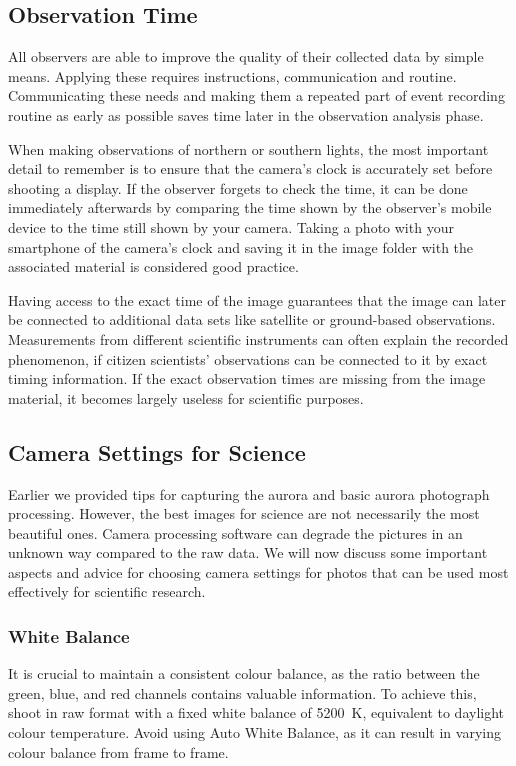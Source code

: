 \documentclass{article}
\begin{document}
\subsection{Observation Time}\label{data_cit_time}

All observers are able to improve the quality of their collected data by simple means. Applying these requires instructions, communication and routine. Communicating these needs and making them a repeated part of event recording routine as early as possible saves time later in the observation analysis phase.

When making observations of northern or southern lights, the most important detail to remember is to ensure that the camera's clock is accurately set before shooting a display. If the observer forgets to check the time, it can be done immediately afterwards by comparing the time shown by the observer's mobile device to the time still shown by your camera. Taking a photo with your smartphone of the camera's clock and saving it in the image folder with the associated material is considered good practice. 

Having access to the exact time of the image guarantees that the image can later be connected to additional data sets like satellite or ground-based observations. Measurements from different scientific instruments can often explain the recorded phenomenon, if citizen scientists' observations can be connected to it by exact timing information. If the exact observation times are missing from the image material, it becomes largely useless for scientific purposes. 

\subsection{Camera Settings for Science}
Earlier we provided tips for capturing the aurora and basic aurora photograph processing. However, the best images for science are not necessarily the most beautiful ones. Camera processing software can degrade the pictures in an unknown way compared to the raw data. We will now discuss some important aspects and advice for choosing camera settings for photos that can be used most effectively for scientific research.

\subsubsection{White Balance}
It is crucial to maintain a consistent colour balance, as the ratio between the green, blue, and red channels contains valuable information. To achieve this, shoot in raw format with a fixed white balance of 5200~K, equivalent to daylight colour temperature. Avoid using Auto White Balance, as it can result in varying colour balance from frame to frame.
\end{document}

